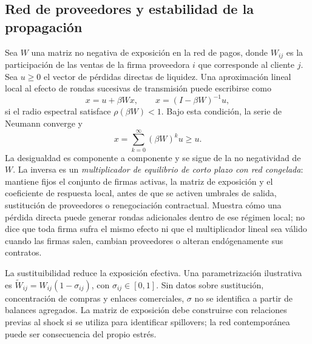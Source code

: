 \documentclass[11pt,a4paper]{article}
\begin{document}
\subsection{Red de proveedores y estabilidad de la propagación}
Sea $W$ una matriz no negativa de exposición en la red de pagos, donde $W_{ij}$ es la participación de las ventas de la firma proveedora $i$ que corresponde al cliente $j$. Sea $u\geq0$ el vector de pérdidas directas de liquidez. Una aproximación lineal local al efecto de rondas sucesivas de transmisión puede escribirse como
\begin{equation}
x=u+\beta Wx,\qquad x=(I-\beta W)^{-1}u, \label{eq:network}
\end{equation}
si el radio espectral satisface $\rho(\beta W)<1$. Bajo esta condición, la serie de Neumann converge y
\begin{equation}
x=\sum_{k=0}^{\infty}(\beta W)^ku\geq u. \label{eq:neumann}
\end{equation}
La desigualdad es componente a componente y se sigue de la no negatividad de $W$. La inversa es un \emph{multiplicador de equilibrio de corto plazo con red congelada}: mantiene fijos el conjunto de firmas activas, la matriz de exposición y el coeficiente de respuesta local, antes de que se activen umbrales de salida, sustitución de proveedores o renegociación contractual. Muestra cómo una pérdida directa puede generar rondas adicionales dentro de ese régimen local; no dice que toda firma sufra el mismo efecto ni que el multiplicador lineal sea válido cuando las firmas salen, cambian proveedores o alteran endógenamente sus contratos.

La sustituibilidad reduce la exposición efectiva. Una parametrización ilustrativa es $\widetilde W_{ij}=W_{ij}(1-\sigma_{ij})$, con $\sigma_{ij}\in[0,1]$. Sin datos sobre sustitución, concentración de compras y enlaces comerciales, $\sigma$ no se identifica a partir de balances agregados. La matriz de exposición debe construirse con relaciones previas al shock si se utiliza para identificar spillovers; la red contemporánea puede ser consecuencia del propio estrés.
\end{document}
